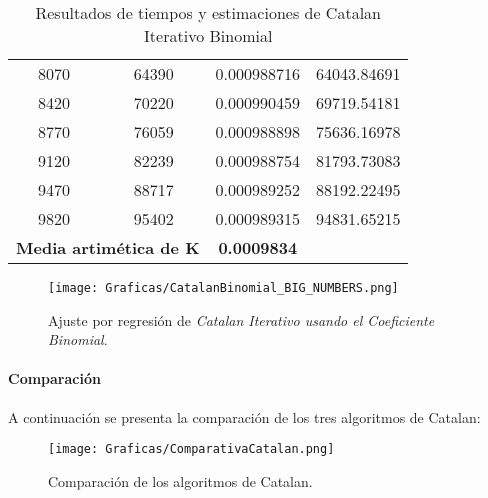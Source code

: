 \documentclass[a4paper,12pt]{article} %
\begin{document}
\begin{table}[H]
{\begin{tabular}{|c|c|c|c|}
			8070                                               & 64390                & 0.000988716              & 64043.84691                                          \\
			8420                                               & 70220                & 0.000990459              & 69719.54181                                          \\
			8770                                               & 76059                & 0.000988898              & 75636.16978                                          \\
			9120                                               & 82239                & 0.000988754              & 81793.73083                                          \\
			9470                                               & 88717                & 0.000989252              & 88192.22495                                          \\
			9820                                               & 95402                & 0.000989315              & 94831.65215                                          \\
			\hline
			\multicolumn{2}{l}{\textbf{Media artimética de K}} & \textbf{0.0009834}                                                                                     \\
			\hline
		\end{tabular}
	}
	\caption{Resultados de tiempos y estimaciones de Catalan Iterativo Binomial}
	\label{tab:tiempos}
\end{table}

\begin{figure}[H]
	\centering
	\texttt{[image: Graficas/CatalanBinomial\_BIG\_NUMBERS.png]}
	\caption{Ajuste por regresión de \textit{Catalan Iterativo usando el Coeficiente Binomial}.}
\end{figure}

\paragraph{Comparación}

A continuación se presenta la comparación de los tres algoritmos de Catalan:

\begin{figure}[H]
	\centering
	\texttt{[image: Graficas/ComparativaCatalan.png]}
	\caption{Comparación de los algoritmos de Catalan.}
\end{figure}
\end{document}

